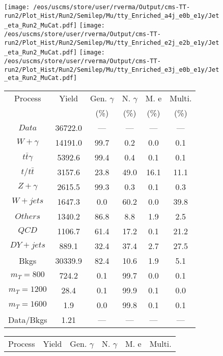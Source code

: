 \begin{figure}
\centering
\texttt{[image: /eos/uscms/store/user/rverma/Output/cms-TT-run2/Plot\_Hist/Run2/Semilep/Mu/tty\_Enriched\_a4j\_e0b\_e1y/Jet\_eta\_Run2\_MuCat.pdf]}
\texttt{[image: /eos/uscms/store/user/rverma/Output/cms-TT-run2/Plot\_Hist/Run2/Semilep/Mu/tty\_Enriched\_e2j\_e2b\_e1y/Jet\_eta\_Run2\_MuCat.pdf]}
\texttt{[image: /eos/uscms/store/user/rverma/Output/cms-TT-run2/Plot\_Hist/Run2/Semilep/Mu/tty\_Enriched\_e3j\_e0b\_e1y/Jet\_eta\_Run2\_MuCat.pdf]}
\begin{minipage}[c]{0.32\textwidth}
\centering
\tiny{
\begin{tabular}{cccccc}
\hline
Process & Yield & Gen. $\gamma$ & N. $\gamma$ & M. e & Multi. \\
 &  & (\%) & (\%) & (\%) & (\%)  \\
\hline
                                                                      $ Data $ &  36722.0 &  --- &  --- &  --- &  ---\\
$ W+\gamma $ &  14191.0 &  99.7 &  0.2 &  0.0 &  0.1\\
$ t\bar{t}\gamma $ &  5392.6 &  99.4 &  0.4 &  0.1 &  0.1\\
$ t/t\bar{t} $ &  3157.6 &  23.8 &  49.0 &  16.1 &  11.1\\
$ Z+\gamma $ &  2615.5 &  99.3 &  0.3 &  0.1 &  0.3\\
$ W+jets $ &  1647.3 &  0.0 &  60.2 &  0.0 &  39.8\\
$ Others $ &  1340.2 &  86.8 &  8.8 &  1.9 &  2.5\\
$ QCD $ &  1106.7 &  61.4 &  17.2 &  0.1 &  21.2\\
$ DY+jets $ &  889.1 &  32.4 &  37.4 &  2.7 &  27.5\\
Bkgs &  30339.9 &  82.4 &  10.6 &  1.9 &  5.1\\
$ m_{T} = 800 $ &  724.2 &  0.1 &  99.7 &  0.0 &  0.1\\
$ m_{T} = 1200 $ &  28.4 &  0.1 &  99.9 &  0.1 &  0.0\\
$ m_{T} = 1600 $ &  1.9 &  0.0 &  99.8 &  0.1 &  0.1\\
Data/Bkgs &  1.21 &  --- &  --- &  --- &  ---\\
\hline
\end{tabular}
}
\end{minipage}
\begin{minipage}[c]{0.32\textwidth}
\centering
\tiny{
\begin{tabular}{cccccc}
\hline
Process & Yield & Gen. $\gamma$ & N. $\gamma$ & M. e & Multi. \\

\end{tabular}}
\end{minipage}
\end{figure}
